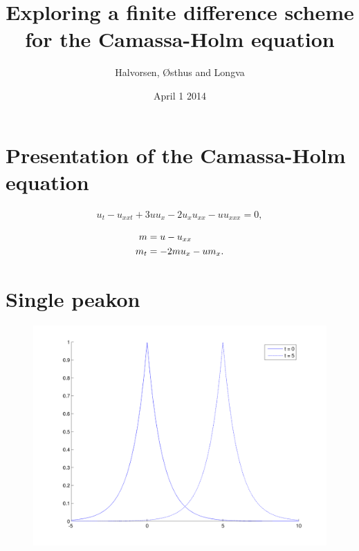 \documentclass{beamer}
\title[Camassa-Holm]{Exploring a finite difference scheme \\ for the Camassa-Holm equation} %
\author{Halvorsen, \O sthus and Longva} %
\institute[NTNU] %
{
Norwegian University of Science and Technology
\medskip
}
\date{April 1 2014} %
\begin{document}
\begin{frame}
\titlepage %
\end{frame}

\section{Presentation of the Camassa-Holm equation}
\begin{frame}

\begin{align*}
u_{t} - u_{xxt} + 3uu_{x} - 2u_{x}u_{xx} - uu_{xxx} = 0,
\end{align*}


\begin{align*}
m &= u - u_{xx} \notag \\
m_t &= -2mu_x - um_x.
\label{eq:CHhamiltonian}
\end{align*}

\end{frame}


\section{Single peakon}
\begin{frame}

\begin{figure}
\includegraphics[width=0.8\linewidth]{gfx/peakon}
\end{figure}

\end{frame}
\end{document}
